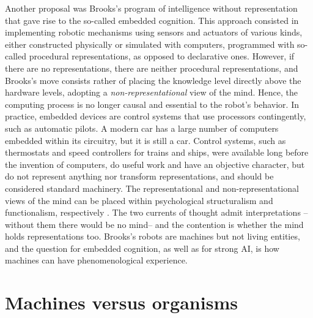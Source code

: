 \documentclass[11pt]{article}
\begin{document}
Another proposal was Brooks's program of intelligence without representation \cite{Brooks,Brooks-IJCAI-1991} that gave rise to the so-called embedded cognition. This approach consisted in implementing robotic mechanisms using sensors and actuators of various kinds, either constructed physically or simulated with computers, programmed with so-called procedural representations, as opposed to declarative ones. However, if there are no representations, there are neither procedural representations, and Brooks's move consists rather of placing the knowledge level directly above the hardware levels, adopting a \emph{non-representational} view of the mind. Hence, the computing process is no longer causal and essential to the robot's behavior. In practice, embedded devices are control systems that use processors contingently, such as automatic pilots. A modern car has a large number of computers embedded within its circuitry, but it is still a car. Control systems, such as thermostats and speed controllers for trains and ships, were available long before the invention of computers, do useful work and have an objective character, but do not represent anything nor transform representations, and should be considered standard machinery. The representational and non-representational views of the mind can be placed within psychological structuralism and functionalism, respectively \cite{Chemero-2013}. The two currents of thought admit interpretations --without them there would be no mind-- and the contention is whether the mind holds representations too. Brooks's robots are machines but not living entities, and the question for embedded cognition, as well as for strong AI, is how machines can have phenomenological experience. 

\section{Machines versus organisms}
\label{sec:machines}
\end{document}

